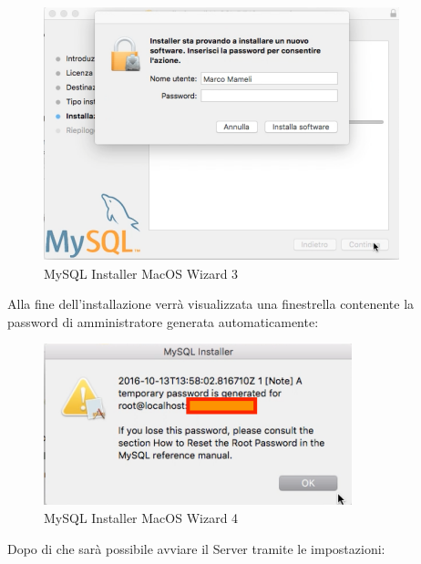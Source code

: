 \begin{itemize}
\begin{center}
\begin{figure}[H]
\centering
\includegraphics[scale=1]{figures/mySQLinstaller_macOS_wizard3.png}
\caption{MySQL Installer MacOS Wizard 3}
\end{figure}
\end{center}

Alla fine dell’installazione verrà visualizzata una finestrella contenente la password di amministratore generata automaticamente: 

\begin{center}
\begin{figure}[H]
\centering
\includegraphics[scale=1]{figures/mySQLinstaller_macOS_wizard4.png}
\caption{MySQL Installer MacOS Wizard 4}
\end{figure}
\end{center}

Dopo di che sarà possibile avviare il Server tramite le impostazioni:

\newpage


\end{itemize}
